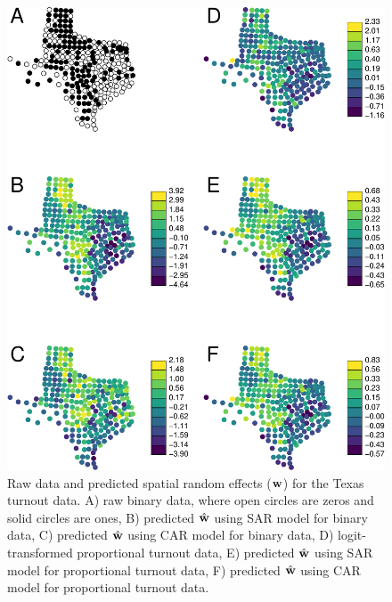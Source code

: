 \documentclass[12pt, titlepage]{article}
\begin{document}
\begin{figure}[H]
  \begin{center}
	    \includegraphics[width=.88\linewidth]{figures/TexTurn_maps}
  \end{center}
  \caption{Raw data and predicted spatial random effects ($\mathbf{w}$) for the Texas turnout data. A) raw binary data, where open circles are zeros and solid circles are ones, B) predicted $\hat{\mathbf{w}}$ using SAR model for binary data, C) predicted $\hat{\mathbf{w}}$ using CAR model for binary data, D) logit-transformed proportional turnout data, E) predicted $\hat{\mathbf{w}}$ using SAR model for proportional turnout data, F) predicted $\hat{\mathbf{w}}$ using CAR model for proportional turnout data.\label{Fig:TexTurn_maps}}
\end{figure}
\end{document}
